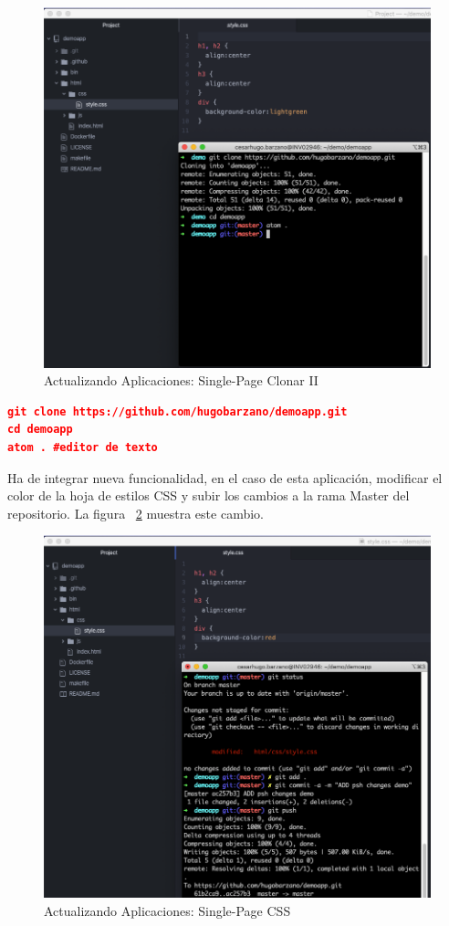 \documentclass[a4paper,11pt]{book}
\begin{document}
\begin{figure}[H]
\centering
\includegraphics[scale=0.4]{imagenes/casouso_a/2_4.png}
\caption{  Actualizando Aplicaciones: Single-Page Clonar II }
\label{2_4}
\end{figure}

\begin{lstlisting}[language=json,firstnumber=1]
git clone https://github.com/hugobarzano/demoapp.git
cd demoapp
atom . #editor de texto
\end{lstlisting}

 Ha de integrar nueva funcionalidad, en el caso de esta aplicación, modificar el color de la hoja de estilos CSS y  subir los cambios a la rama Master del repositorio. La figura ~\ref{2_5} muestra este cambio. 
 
 \begin{figure}[H]
\centering
\includegraphics[scale=0.4]{imagenes/casouso_a/2_5.png}
\caption{ Actualizando Aplicaciones: Single-Page CSS}
\label{2_5}
\end{figure}
\end{document}
